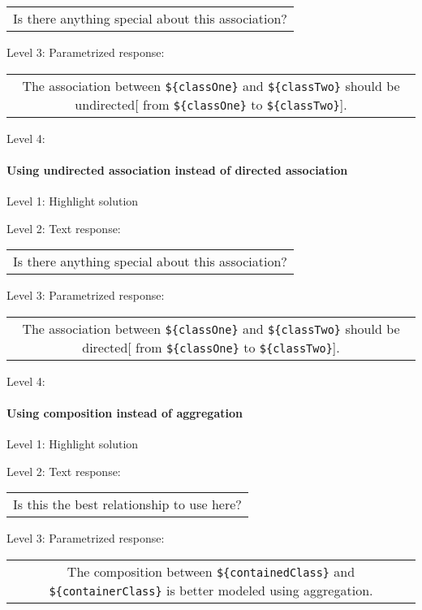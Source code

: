 \begin{tabular}{|c}
Is there anything special about this association?
\end{tabular} \medskip

\noindent Level 3: Parametrized response: \medskip

\begin{tabular}{|c}
The association between \verb|${classOne}| and \verb|${classTwo}| should be undirected[ from \verb|${classOne}| to \verb|${classTwo}|].
\end{tabular} \medskip

\noindent Level 4: 
\paragraph{Using undirected association instead of directed association}

\noindent Level 1: Highlight solution \medskip

\noindent Level 2: Text response: \medskip

\begin{tabular}{|c}
Is there anything special about this association?
\end{tabular} \medskip

\noindent Level 3: Parametrized response: \medskip

\begin{tabular}{|c}
The association between \verb|${classOne}| and \verb|${classTwo}| should be directed[ from \verb|${classOne}| to \verb|${classTwo}|].
\end{tabular} \medskip

\noindent Level 4: 
\paragraph{Using composition instead of aggregation}

\noindent Level 1: Highlight solution \medskip

\noindent Level 2: Text response: \medskip

\begin{tabular}{|c}
Is this the best relationship to use here?
\end{tabular} \medskip

\noindent Level 3: Parametrized response: \medskip

\begin{tabular}{|c}
The composition between \verb|${containedClass}| and \verb|${containerClass}| is better modeled using aggregation.
\end{tabular} \medskip

